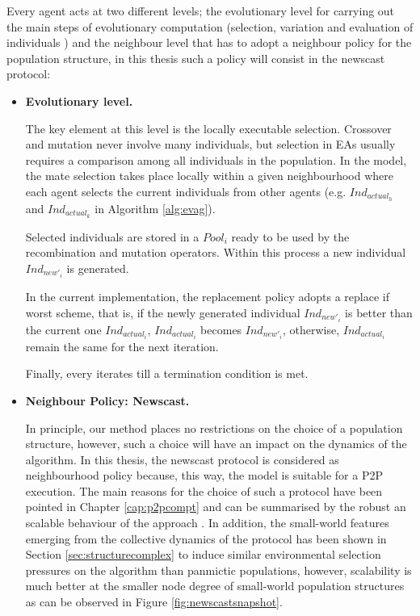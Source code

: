 Every agent acts at two different levels; the evolutionary level for carrying out the main steps of evolutionary computation (selection, variation and evaluation of individuals \cite{eiben:eas}) and the neighbour level that has to adopt a neighbour policy for the population structure, in this thesis such a policy will consist in the newscast protocol:



\begin{itemize}
\item {\bf Evolutionary level.} 

The key element at this level is the locally executable selection. Crossover and mutation never involve
many individuals, but selection in EAs usually requires a comparison among all individuals in the population. In the \evag model, the mate selection takes place locally within a given neighbourhood where 
each agent selects the current individuals from other agents (e.g. $Ind_{actual_h}$ and $Ind_{actual_k}$ in Algorithm \ref{alg:evag}).

Selected individuals are stored in a $Pool_i$ ready to be used by the recombination and mutation operators.
Within this process a new individual $Ind_{new'_i}$ is generated.

In the current implementation, the replacement policy adopts a replace if worst scheme, that is, if the newly generated individual $Ind_{new'_i}$ is better than
the current one $Ind_{actual_i}$, $Ind_{actual_i}$ becomes $Ind_{new'_i}$, otherwise,  $Ind_{actual_i}$ remain the same for the next iteration.

Finally, every \evag iterates till a termination condition is met. 

\item {\bf Neighbour Policy: Newscast.} 

In principle,  our method places no restrictions on the choice of a
population structure, however, such a choice will have an impact on the
dynamics of the algorithm. In this thesis, the newscast protocol is considered as
neighbourhood policy because, this way, the model is suitable for a P2P execution. The main reasons for the choice of such a protocol have been pointed in Chapter \ref{cap:p2pcompt} and can be summarised by the robust an scalable behaviour of the approach \cite{spyros:robustscalable}. In addition,  the small-world features emerging from the collective dynamics of the protocol has been shown in Section \ref{sec:structurecomplex} to induce similar environmental selection pressures on the algorithm than panmictic populations, however, scalability is much better at the smaller node degree of small-world population structures as can be observed in Figure \ref{fig:newscastsnapshot}.

\end{itemize}

